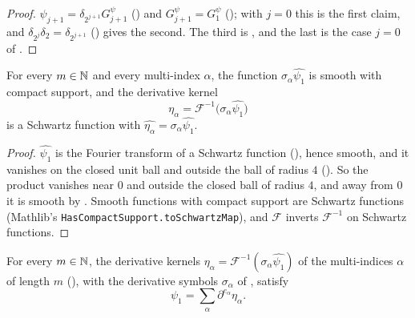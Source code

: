 \begin{proof}
\leanok
$\psi_{j+1} = \delta_{2^{j+1}} G^{\psi}_{j+1}$ () and
$G^{\psi}_{j+1} = G^{\psi}_1$ (); with $j = 0$ this is the first claim, and
$\delta_{2^j} \delta_2 = \delta_{2^{j+1}}$ () gives the second. The third
is , and the last is the case $j = 0$ of
.
\end{proof}

\begin{lemma}
\label{lem:derivative-kernel}
\leanok
{}
For every $m \in \mathbb{N}$ and every multi-index $\alpha$, the function
$\sigma_\alpha \widehat{\psi_1}$ is smooth with compact support, and the derivative kernel
\[
  \eta_\alpha = \mathcal F^{-1} \bigl( \sigma_\alpha \widehat{\psi_1} \bigr)
\]
is a Schwartz function with $\widehat{\eta_\alpha} = \sigma_\alpha \widehat{\psi_1}$.
\end{lemma}

\begin{proof}
\leanok
$\widehat{\psi_1}$ is the Fourier transform of a Schwartz function (), hence
smooth, and it vanishes on the closed unit ball and outside the ball of radius $4$
(). So the product vanishes near $0$ and outside the closed ball
of radius $4$, and away from $0$ it is smooth by . Smooth functions
with compact support are Schwartz functions (Mathlib's
\texttt{HasCompactSupport.\allowbreak toSchwartzMap}), and $\mathcal F$ inverts
$\mathcal F^{-1}$ on Schwartz functions.
\end{proof}

\begin{theorem}
\label{thm:psi-one-derivatives}
\leanok
{}
For every $m \in \mathbb{N}$, the derivative kernels
$\eta_\alpha = \mathcal F^{-1}(\sigma_\alpha \widehat{\psi_1})$ of the multi-indices $\alpha$ of
length $m$ (), with the derivative symbols $\sigma_\alpha$ of
, satisfy
\[
  \psi_1 = \sum_\alpha \partial^{e_\alpha} \eta_\alpha .
\]
\end{theorem}

